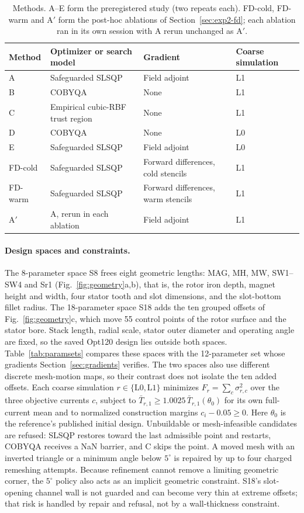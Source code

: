 \begin{table}[H]\centering\small
\caption{Methods. A--E form the preregistered study (two repeats each).
FD-cold, FD-warm and A$'$ form the post-hoc ablations of
Section~\ref{sec:exp2-fd}; each ablation ran in its own session with A
rerun unchanged as A$'$.}
\label{tab:methods}\setlength{\tabcolsep}{5pt}
\begin{tabular}{llll}\toprule
Method & Optimizer or search model & Gradient & Coarse simulation\\\midrule
A & Safeguarded SLSQP & Field adjoint & L1\\
B & COBYQA & None & L1\\
C & Empirical cubic-RBF trust region & None & L1\\
D & COBYQA & None & L0\\
E & Safeguarded SLSQP & Field adjoint & L0\\\addlinespace
FD-cold & Safeguarded SLSQP & Forward differences, cold stencils & L1\\
FD-warm & Safeguarded SLSQP & Forward differences, warm stencils & L1\\
A$'$ & A, rerun in each ablation & Field adjoint & L1\\\bottomrule
\end{tabular}
\end{table}

\paragraph{Design spaces and constraints.}
The 8-parameter space S8 frees eight geometric lengths: MAG, MH, MW,
SW1--SW4 and Sr1 (Fig.~\ref{fig:geometry}a,b), that is, the rotor iron
depth, magnet height and width, four stator tooth and slot dimensions, and
the slot-bottom fillet radius. The 18-parameter space S18 adds the ten
grouped offsets of Fig.~\ref{fig:geometry}c, which move 55 control points
of the rotor surface and the stator bore. Stack length, radial scale,
stator outer diameter and operating angle are fixed, so the saved Opt120
design lies outside both spaces. Table~\ref{tab:paramsets} compares these
spaces with the 12-parameter set whose gradients Section~\ref{sec:gradients}
verifies. The two spaces also use different discrete mesh-motion maps, so
their contrast does not isolate the ten added offsets.
Each coarse simulation $r\in\{\mathrm{L0},\mathrm{L1}\}$ minimizes
$F_r=\sum_c\sigma_{r,c}^2$ over the three objective currents $c$, subject to
$\bar T_{r,1}\geq1.0025\,\bar T_{r,1}(\theta_0)$ for its own full-current mean and to
normalized construction margins $c_i-0.05\geq0$. Here $\theta_0$ is the
reference's published initial design. Unbuildable or
mesh-infeasible candidates are refused: SLSQP restores toward the last
admissible point and restarts, COBYQA receives a NaN barrier, and C skips
the point. A moved mesh with an inverted triangle or a minimum angle below
$5^\circ$ is repaired by up to four charged remeshing attempts. Because
refinement cannot remove a limiting geometric corner, the $5^\circ$ policy
also acts as an implicit geometric constraint. S18's slot-opening
channel wall is not guarded and can become very thin at extreme offsets;
that risk is handled by repair and refusal, not by a wall-thickness
constraint.

